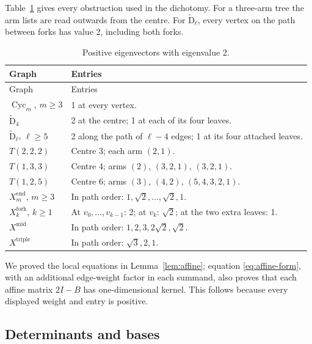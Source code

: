 \documentclass[11pt]{amsart}
\newcommand\opk[1]{\mathop{\mathrm{#1}}\nolimits}
\theoremstyle{definition}
\newcommand{\typ}[1]{\mathrm{#1}}
\newcommand{\Cyc}{\opk{Cyc}}
\begin{document}
Table~\ref{tab:affine} gives every obstruction used in the dichotomy.
For a three-arm tree the arm lists are read outwards from the centre.
For $\widetilde{\typ D}_\ell$, every vertex on the path between forks
has value 2, including both forks.
\begin{longtable}{@{}p{}p{}@{}}
\caption{Positive eigenvectors with eigenvalue 2.}\label{tab:affine}\\
\toprule
Graph&Entries\\\midrule
\endfirsthead
\toprule Graph&Entries\\\midrule\endhead
$\Cyc_m$, $m\geq3$&1 at every vertex.\\[3pt]
$\widetilde{\typ D}_4$&2 at the centre; 1 at each of its four leaves.\\[3pt]
$\widetilde{\typ D}_\ell$, $\ell\geq5$&2 along the path of $\ell-4$
edges; 1 at its four attached leaves.\\[3pt]
$T(2,2,2)$&Centre 3; each arm $(2,1)$.\\[3pt]
$T(1,3,3)$&Centre 4; arms $(2)$, $(3,2,1)$, $(3,2,1)$.\\[3pt]
$T(1,2,5)$&Centre 6; arms $(3)$, $(4,2)$, $(5,4,3,2,1)$.\\[3pt]
$X^{\mathrm{end}}_m$, $m\geq3$&In path order: $1,\sqrt2,\ldots,\sqrt2,1$.\\[3pt]
$X^{\mathrm{fork}}_k$, $k\geq1$&At $v_0,\ldots,v_{k-1}$: 2; at $v_k$: $\sqrt2$;
at the two extra leaves: 1.\\[3pt]
$X^{\mathrm{mid}}$&In path order: $1,2,3,2\sqrt2,\sqrt2$.\\[3pt]
$X^{\mathrm{triple}}$&In path order: $\sqrt3,2,1$.\\
\bottomrule
\end{longtable}
We proved the local equations in Lemma~\ref{lem:affine}; equation
\eqref{eq:affine-form}, with an additional edge-weight factor in each
summand, also proves that each affine matrix $2I-B$ has one-dimensional
kernel. This follows because every displayed weight and entry is positive.

\subsection{Determinants and bases}
\end{document}
